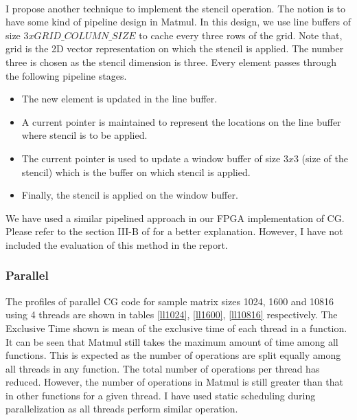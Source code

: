 \documentclass{article}
\begin{document}
\begin{spacing}{1.1}
\\
I propose another technique to implement the stencil operation. The notion is to have some kind of pipeline design in Matmul. In this design, we use line buffers of size $3xGRID\_ COLUMN\_SIZE$ to cache every three rows of the grid. Note that, grid is the 2D vector representation on which the stencil is applied. The number three is chosen as the stencil dimension is three. Every element passes through the following pipeline stages.
\begin{itemize}
    \item The new element is updated in the line buffer.
    \item A current pointer is maintained to represent the locations on the line buffer where stencil is to be applied.
    \item The current pointer is used to update a window buffer of size $3x3$ (size of the stencil) which is the buffer on which stencil is applied.
    \item Finally, the stencil is applied on the window buffer.
\end{itemize}
We have used a similar pipelined approach in our FPGA implementation of CG. Please refer to the section III-B of \cite{FPGACG} for a better explanation. However, I have not included the evaluation of this method in the report.


\subsubsection{Parallel}

The profiles of parallel CG code for sample matrix sizes 1024, 1600 and 10816 using 4 threads are shown in tables \ref{ll1024}, \ref{ll1600}, \ref{ll10816} respectively. The Exclusive Time shown is mean of the exclusive time of each thread in a function. It can be seen that Matmul still takes the maximum amount of time among all functions. This is expected as the number of operations are split equally among all threads in any function. The total number of operations per thread has reduced. However, the number of operations in Matmul is still greater than that in other functions for a given thread. I have used static scheduling during parallelization as all threads perform similar operation. 


\end{spacing}
\end{document}
